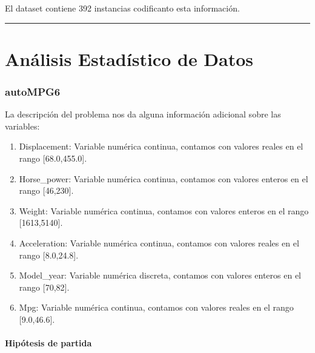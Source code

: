 \documentclass[
]{article}
\providecommand{\tightlist}{%
  \setlength{\itemsep}{0pt}\setlength{\parskip}{0pt}}
\begin{document}
El dataset contiene 392 instancias codificanto esta información.

\begin{center}\rule{0.5\linewidth}{0.5pt}\end{center}

\hypertarget{anuxe1lisis-estaduxedstico-de-datos}{%
\section{Análisis Estadístico de
Datos}\label{anuxe1lisis-estaduxedstico-de-datos}}

\hypertarget{autompg6-1}{%
\subsubsection{autoMPG6}\label{autompg6-1}}

La descripción del problema nos da alguna información adicional sobre
las variables:

\begin{enumerate}
\def\labelenumi{\arabic{enumi}.}
\tightlist
\item
  Displacement: Variable numérica continua, contamos con valores reales
  en el rango {[}68.0,455.0{]}.
\item
  Horse\_power: Variable numérica continua, contamos con valores enteros
  en el rango {[}46,230{]}.
\item
  Weight: Variable numérica continua, contamos con valores enteros en el
  rango {[}1613,5140{]}.
\item
  Acceleration: Variable numérica continua, contamos con valores reales
  en el rango {[}8.0,24.8{]}.
\item
  Model\_year: Variable numérica discreta, contamos con valores enteros
  en el rango {[}70,82{]}.
\item
  Mpg: Variable numérica continua, contamos con valores reales en el
  rango {[}9.0,46.6{]}.
\end{enumerate}

\hypertarget{hipuxf3tesis-de-partida}{%
\paragraph{Hipótesis de partida}\label{hipuxf3tesis-de-partida}}
\end{document}

